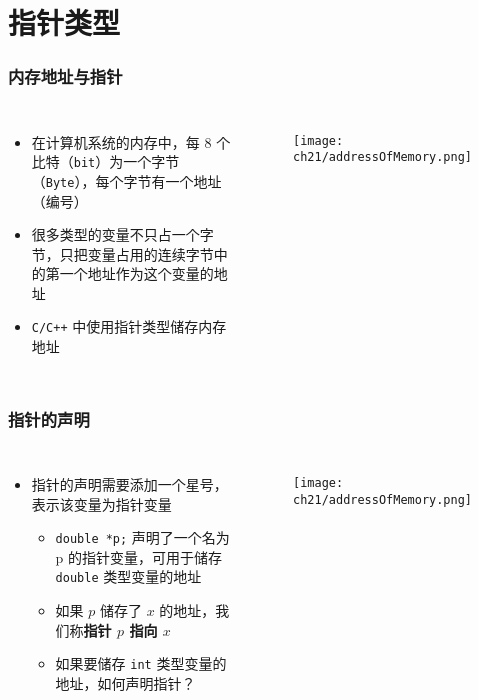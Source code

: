 \section{指针类型}

\begin{frame}[fragile]
    \frametitle{内存地址与指针}

    \begin{columns}
        \begin{itemize}
           \item 在计算机系统的内存中，每 $8$ 个比特（\lstinline|bit|）为一个字节（\lstinline|Byte|），每个字节有一个地址（编号）
           \item 很多类型的变量不只占一个字节，只把变量占用的连续字节中的第一个地址作为这个变量的地址
           \item \lstinline|C/C++| 中使用指针类型储存内存地址
        \end{itemize}

        \begin{figure}
            \texttt{[image: ch21/addressOfMemory.png]}
        \end{figure}
    \end{columns}
\end{frame}

\begin{frame}[fragile]
    \frametitle{指针的声明}

    \begin{columns}
        \begin{itemize}[<+->]
           \item 指针的声明需要添加一个星号，表示该变量为指针变量
            \begin{itemize}
               \item \lstinline|double *p;| 声明了一个名为 p 的指针变量，可用于储存 \lstinline|double| 类型变量的地址
               \item 如果 $p$ 储存了 $x$ 的地址，我们称\textbf{指针 $p$ 指向 $x$}
               \item 如果要储存 \lstinline|int| 类型变量的地址，如何声明指针？
            \end{itemize}
        \end{itemize}

        \begin{figure}
            \texttt{[image: ch21/addressOfMemory.png]}
        \end{figure}
    \end{columns}
\end{frame}


